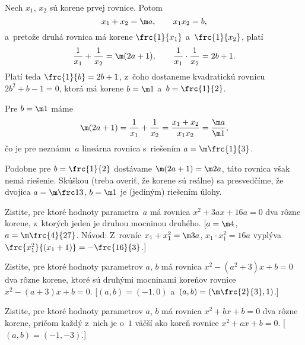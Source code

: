 {%
Nech $x_1$, $x_2$ sú korene prvej rovnice. Potom
$$
x_1+x_2=\m a,\qquad x_1x_2=b,
$$
a~pretože druhá rovnica má korene $\frc{1}{x_1}$ a~$\frc{1}{x_2}$, platí
$$
\frac{1}{x_1}+\frac{1}{x_2}=\m(2a+1), \qquad
\frac{1}{x_1}\cdot\frac{1}{x_2}=2b+1.
$$
Platí teda $\frc{1}{b}=2b+1$, z~čoho dostaneme kvadratickú rovnicu
$2b^2+b-1=0$, ktorá má korene $b=\m1$ a~$b=\frc{1}{2}$.

Pre $b=\m1$ máme
$$
\m(2a+1)= \frac{1}{x_1}+\frac{1}{x_2}= \frac{x_1+x_2}{x_1x_2}=
\frac{\m a}{\m1},
$$
čo je pre neznámu~$a$ lineárna rovnica s~riešením
$a=\m\frc{1}{3}$.

Podobne pre $b= \frc{1}{2}$ dostávame $\m(2a+1)=\m2a$, táto
rovnica však nemá riešenie. Skúškou (treba overiť, že korene
sú reálne) sa presvedčíme, že dvojica $a={\m\frc13}$, $b={\m1}$
je (jediným) riešením úlohy.


Zistite, pre ktoré hodnoty parametra~$a$ má
rovnica $x^2+3ax+16a=0$ dva rôzne korene, z~ktorých jeden je
druhou mocninou druhého. [$a=\m4$, $a=\m\frc{4}{27}$. Návod:
Z~rovníc $x_1+x_1^2=\m3a$, $x_1\cdot x_1^2=16a$ vyplýva
$\frc{x_1^2}{(x_1+1)}=- \frc{16}{3}$.]

Zistite, pre ktoré hodnoty parametrov $a$, $b$ má rovnica
$x^2-(a^2+3)x+b=0$ dva rôzne korene, ktoré sú druhými mocninami
koreňov rovnice $x^2-(a+3)x+b=0$. [$(a,b)=(-1,0)$ 
a~$(a,b)=(\m\frc{2}{3},1)$.]

Zistite, pre ktoré hodnoty parametrov $a$, $b$ má rovnica
$x^2+bx+b=0$ dva rôzne korene, pričom každý z~nich je o~$1$ väčší
ako koreň rovnice $x^2+ax+b=0$. [$(a,b)=(-1,-3)$.]
}

